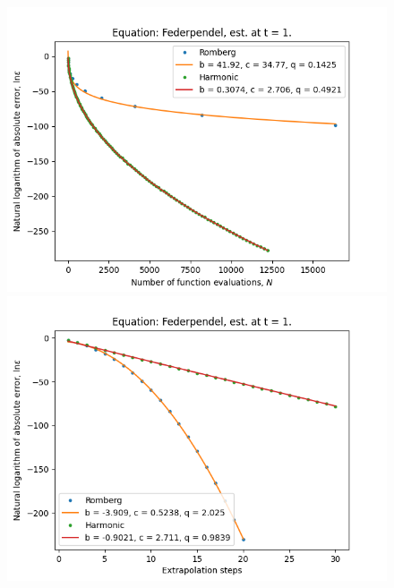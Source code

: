 \begin{figure}[H]
\centering
\begin{minipage}{0.45\textwidth}
\centering
\includegraphics[scale=0.45]{../results/emr_plots/federpendel_1_hp_trend.png}
\end{minipage}
\begin{minipage}{0.45\textwidth}
\centering
\includegraphics[scale=0.45]{../results/emr_plots/federpendel_1_hp_steps.png}
\end{minipage}
\end{figure}

